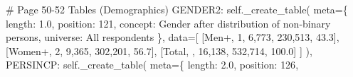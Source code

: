 \documentclass[
  11pt,
  a4paper,
]{article}
\newenvironment{Shaded}{\begin{snugshade}}{\end{snugshade}}
\newcommand{\CommentTok}[1]{\textcolor[rgb]{0.37,0.37,0.37}{#1}}
\newcommand{\NormalTok}[1]{\textcolor[rgb]{0.00,0.23,0.31}{#1}}
\newcommand{\OperatorTok}[1]{\textcolor[rgb]{0.37,0.37,0.37}{#1}}
\newcommand{\StringTok}[1]{\textcolor[rgb]{0.13,0.47,0.30}{#1}}
\newcommand{\VariableTok}[1]{\textcolor[rgb]{0.07,0.07,0.07}{#1}}
\begin{document}
\begin{Shaded}
\begin{Highlighting}[]
            \CommentTok{\# Page 50{-}52 Tables (Demographics)}
            \StringTok{\textquotesingle{}GENDER2\textquotesingle{}}\NormalTok{: }\VariableTok{self}\NormalTok{.\_create\_table(}
\NormalTok{                meta}\OperatorTok{=}\NormalTok{\{}
                    \StringTok{\textquotesingle{}length\textquotesingle{}}\NormalTok{: }\StringTok{\textquotesingle{}1.0\textquotesingle{}}\NormalTok{, }\StringTok{\textquotesingle{}position\textquotesingle{}}\NormalTok{: }\StringTok{\textquotesingle{}121\textquotesingle{}}\NormalTok{,}
                    \StringTok{\textquotesingle{}concept\textquotesingle{}}\NormalTok{: }\StringTok{\textquotesingle{}Gender after distribution of non{-}binary persons\textquotesingle{}}\NormalTok{,}
                    \StringTok{\textquotesingle{}universe\textquotesingle{}}\NormalTok{: }\StringTok{\textquotesingle{}All respondents\textquotesingle{}}
\NormalTok{                \},}
\NormalTok{                data}\OperatorTok{=}\NormalTok{[}
\NormalTok{                    [}\StringTok{\textquotesingle{}Men+\textquotesingle{}}\NormalTok{, }\StringTok{\textquotesingle{}1\textquotesingle{}}\NormalTok{, }\StringTok{\textquotesingle{}6,773\textquotesingle{}}\NormalTok{, }\StringTok{\textquotesingle{}230,513\textquotesingle{}}\NormalTok{, }\StringTok{\textquotesingle{}43.3\textquotesingle{}}\NormalTok{],}
\NormalTok{                    [}\StringTok{\textquotesingle{}Women+\textquotesingle{}}\NormalTok{, }\StringTok{\textquotesingle{}2\textquotesingle{}}\NormalTok{, }\StringTok{\textquotesingle{}9,365\textquotesingle{}}\NormalTok{, }\StringTok{\textquotesingle{}302,201\textquotesingle{}}\NormalTok{, }\StringTok{\textquotesingle{}56.7\textquotesingle{}}\NormalTok{],}
\NormalTok{                    [}\StringTok{\textquotesingle{}Total\textquotesingle{}}\NormalTok{, }\StringTok{\textquotesingle{}\textquotesingle{}}\NormalTok{, }\StringTok{\textquotesingle{}16,138\textquotesingle{}}\NormalTok{, }\StringTok{\textquotesingle{}532,714\textquotesingle{}}\NormalTok{, }\StringTok{\textquotesingle{}100.0\textquotesingle{}}\NormalTok{]}
\NormalTok{                ]}
\NormalTok{            ),}
            \StringTok{\textquotesingle{}PERSINCP\textquotesingle{}}\NormalTok{: }\VariableTok{self}\NormalTok{.\_create\_table(}
\NormalTok{                meta}\OperatorTok{=}\NormalTok{\{}
                    \StringTok{\textquotesingle{}length\textquotesingle{}}\NormalTok{: }\StringTok{\textquotesingle{}2.0\textquotesingle{}}\NormalTok{, }\StringTok{\textquotesingle{}position\textquotesingle{}}\NormalTok{: }\StringTok{\textquotesingle{}126\textquotesingle{}}\NormalTok{,}

\end{Highlighting}
\end{Shaded}
\end{document}
